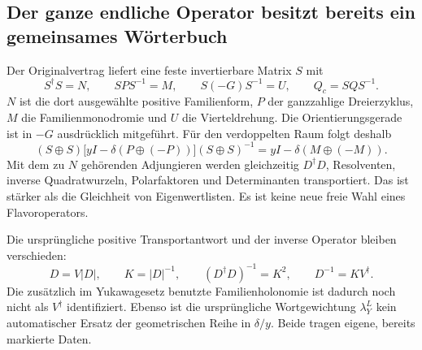 \subsection{Der ganze endliche Operator besitzt bereits ein gemeinsames Wörterbuch}
Der Originalvertrag  liefert eine feste invertierbare Matrix $S$ mit
\begin{equation}
S^\dagger S=N,\qquad SPS^{-1}=M,\qquad
S(-G)S^{-1}=U,\qquad Q_c=SQS^{-1}.
\end{equation}
$N$ ist die dort ausgewählte positive Familienform, $P$ der ganzzahlige Dreierzyklus, $M$ die Familienmonodromie und $U$ die Vierteldrehung. Die Orientierungsgerade ist in $-G$ ausdrücklich mitgeführt. Für den verdoppelten Raum folgt deshalb
\begin{equation}\label{eq:fullflavorintertwiner}
(S\oplus S)\bigl[yI-\delta(P\oplus(-P))\bigr](S\oplus S)^{-1}
=yI-\delta(M\oplus(-M)).
\end{equation}
Mit dem zu $N$ gehörenden Adjungieren werden gleichzeitig $D^\dagger D$, Resolventen, inverse Quadratwurzeln, Polarfaktoren und Determinanten transportiert. Das ist stärker als die Gleichheit von Eigenwertlisten. Es ist keine neue freie Wahl eines Flavoroperators.

Die ursprüngliche positive Transportantwort und der inverse Operator bleiben verschieden:
\begin{equation}
D=V|D|,\qquad K=|D|^{-1},\qquad
(D^\dagger D)^{-1}=K^2,\qquad D^{-1}=KV^\dagger .
\end{equation}
Die zusätzlich im Yukawagesetz benutzte Familienholonomie ist dadurch noch nicht als $V^\dagger$ identifiziert. Ebenso ist die ursprüngliche Wortgewichtung $\lambda_Y^L$ kein automatischer Ersatz der geometrischen Reihe in $\delta/y$. Beide tragen eigene, bereits markierte Daten.

